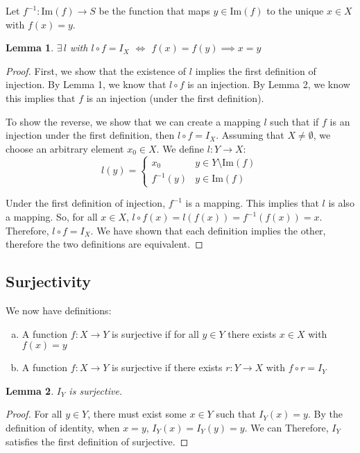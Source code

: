\documentclass[12pt]{article}
\newtheorem{lemma}{Lemma}
\begin{document}
Let $f^{-1} : \mathrm{Im}(f) \rightarrow S$ be the function that maps $y \in \mathrm{Im}(f)$ to the unique $x \in X$ with $f(x) = y$. 
\begin{lemma} 
$\exists \, l$ with $l \circ f = I_X$ $\iff$ $f(x) = f(y) \implies x = y$
\end{lemma}
\begin{proof}
First, we show that the existence of $l$ implies the first definition of injection. By Lemma 1, we know that $l \circ f$ is an injection. By Lemma 2, we know this implies that $f$ is an injection (under the first definition).

To show the reverse, we show that we can create a mapping $l$ such that if $f$ is an injection under the first definition, then $l \circ f = I_X$. Assuming that $X \neq \emptyset$, we choose an arbitrary element $x_0 \in X$. We define $l : Y \rightarrow X$:
\[
l(y) = \begin{cases}
x_0 & y \in Y \setminus \mathrm{Im}(f)\\
f^{-1}(y) & y \in \mathrm{Im}(f)
\end{cases}
\]

Under the first definition of injection, $f^{-1}$ is a mapping. This implies that $l$ is also a mapping. So, for all $x \in X$, $l \circ f(x) = l(f(x)) = f^{-1}(f(x)) = x$. Therefore, $l \circ f = I_X$. We have shown that each definition implies the other, therefore the two definitions are equivalent.
\end{proof}

\subsection*{Surjectivity}
We now have definitions:
\begin{enumerate}[(a)]
\item A function $f : X \rightarrow Y$ is surjective if for all $y \in Y$ there exists $x \in X$ with $f(x) = y$
\item A function $f : X \rightarrow Y$ is surjective if there exists $r : Y \rightarrow X$ with $f \circ r = I_Y$
\end{enumerate}

\begin{lemma}
$I_Y$ is surjective.
\end{lemma}
\begin{proof}
For all $y \in Y$, there must exist some $x \in Y$ such that $I_Y(x) = y$. By the definition of identity, when $x = y$, $I_Y(x) = I_Y(y) = y$. We can Therefore, $I_Y$ satisfies the first definition of surjective.
\end{proof}
\end{document}
